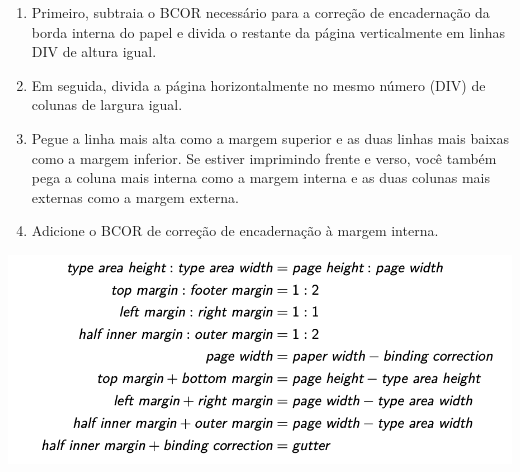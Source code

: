  \begin{enumerate}
     \item Primeiro, subtraia o BCOR necessário para a correção de encadernação da borda interna do papel e divida o restante da página verticalmente em linhas DIV de altura igual.
     \item Em seguida, divida a página horizontalmente no mesmo número (DIV) de colunas de largura igual.
     \item Pegue a linha mais alta como a margem superior e as duas linhas mais baixas como a margem inferior. Se estiver imprimindo frente e verso, você também pega a coluna mais interna como a margem interna e as duas colunas mais externas como a margem externa.
     \item Adicione o BCOR de correção de encadernação à margem interna.
 \end{enumerate}
\vspace{2cm}
\includegraphics[scale=0.9]{imagens/imagem01.png}
